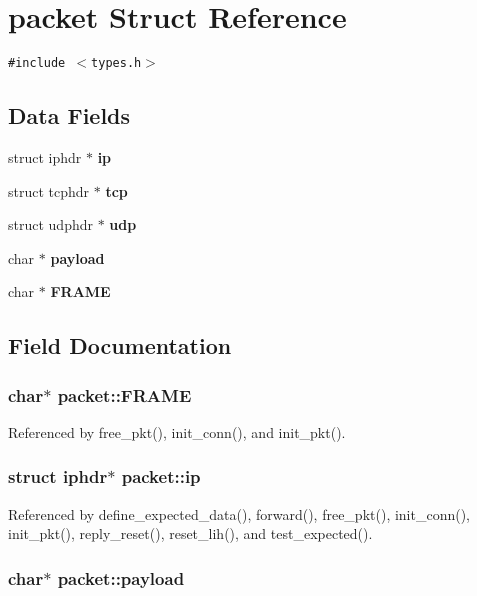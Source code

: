 \section{packet Struct Reference}
\label{structpacket}
{\tt \#include $<$types.h$>$}

\subsection*{Data Fields}
\begin{CompactItemize}
\item 
struct iphdr $\ast$ {\bf ip}
\item 
struct tcphdr $\ast$ {\bf tcp}
\item 
struct udphdr $\ast$ {\bf udp}
\item 
char $\ast$ {\bf payload}
\item 
char $\ast$ {\bf FRAME}
\end{CompactItemize}


\subsection{Field Documentation}
\subsubsection[{FRAME}]{\setlength{\rightskip}{0pt plus 5cm}char$\ast$ {\bf packet::FRAME}}\label{structpacket_f92293116debde497eb17ffe9c7c934a}




Referenced by free\_\-pkt(), init\_\-conn(), and init\_\-pkt().
\subsubsection[{ip}]{\setlength{\rightskip}{0pt plus 5cm}struct iphdr$\ast$ {\bf packet::ip}\hspace{0.3cm}{\tt  [read]}}\label{structpacket_db0a78e8409806cae34e788c3d91bd7e}




Referenced by define\_\-expected\_\-data(), forward(), free\_\-pkt(), init\_\-conn(), init\_\-pkt(), reply\_\-reset(), reset\_\-lih(), and test\_\-expected().
\subsubsection[{payload}]{\setlength{\rightskip}{0pt plus 5cm}char$\ast$ {\bf packet::payload}}\label{structpacket_c2d864665aaa762fd6a303f26feaff7d}




